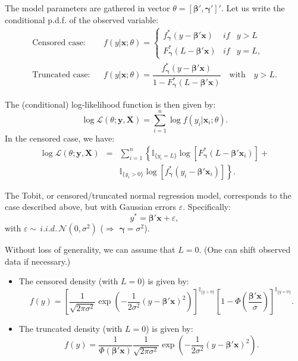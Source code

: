 \documentclass[
  12pt,
]{book}
\theoremstyle{definition}
\theoremstyle{definition}
\theoremstyle{definition}
\theoremstyle{definition}
\theoremstyle{remark}
\begin{document}
The model parameters are gathered in vector \(\theta = [\boldsymbol\beta',\boldsymbol\gamma']'\). Let us write the conditional p.d.f. of the observed variable:
\begin{eqnarray*}
\mbox{Censored case:}&& f(y|\mathbf{x};\theta) = \left\{
\begin{array}{ccc}
f_{\boldsymbol\gamma}^*(y -  \boldsymbol\beta'\mathbf{x}) &if& y>L \\
F_{\boldsymbol\gamma}^*(L-  \boldsymbol\beta'\mathbf{x}) &if& y = L,
\end{array}
\right.\\
\mbox{Truncated case:}&&  f(y|\mathbf{x};\theta) =
\dfrac{f_{\boldsymbol\gamma}^*(y -  \boldsymbol\beta'\mathbf{x})}{1 - F_{\boldsymbol\gamma}^*(L-  \boldsymbol\beta'\mathbf{x})} \quad \mbox{with} \quad y>L.
\end{eqnarray*}

The (conditional) log-likelihood function is then given by:
\[
\log \mathcal{L}(\theta;\mathbf{y},\mathbf{X}) = \sum_{i=1}^n \log f(y_i|\mathbf{x}_i;\theta).
\]
In the censored case, we have:
\begin{eqnarray*}
\log \mathcal{L}(\theta;\mathbf{y},\mathbf{X}) &=& \sum_{i=1}^n \left\{
\mathbb{I}_{\{y_i=L\}}\log\left[F_{\boldsymbol\gamma}^*(L-  \boldsymbol\beta'\mathbf{x}_i)\right] + \right.\\
&& \left. \mathbb{I}_{\{y_i>0\}} \log \left[f_{\boldsymbol\gamma}^*(y_i -  \boldsymbol\beta'\mathbf{x}_i)\right]\right\}.
\end{eqnarray*}

The Tobit, or censored/truncated normal regression model, corresponds to the case described above, but with Gaussian errors \(\varepsilon\). Specifically:
\[
y^* = \boldsymbol\beta'\mathbf{x} + \varepsilon,
\]
with \(\varepsilon \sim \,i.i.d.\,\mathcal{N}(0,\sigma^2)\) (\(\Rightarrow\) \(\boldsymbol\gamma = \sigma^2\)).

Without loss of generality, we can assume that \(L=0\). (One can shift observed data if necessary.)

\begin{itemize}
\item
  The censored density (with \(L=0\)) is given by:
  \[
  f(y) = \left[
  \frac{1}{\sqrt{2 \pi \sigma^2}}\exp\left(-\frac{1}{2 \sigma^2}(y - \boldsymbol\beta'\mathbf{x})^2\right)
  \right]^{\mathbb{I}_{\{y>0\}}}
  \left[
  1 - \Phi\left(\frac{\boldsymbol\beta'\mathbf{x}}{\sigma}\right)
  \right]^{\mathbb{I}_{\{y=0\}}}.
  \]
\item
  The truncated density (with \(L=0\)) is given by:
  \[
  f(y) = \frac{1}{\Phi(\boldsymbol\beta'\mathbf{x})}
  \frac{1}{\sqrt{2 \pi \sigma^2}}\exp\left(-\frac{1}{2 \sigma^2}(y - \boldsymbol\beta'\mathbf{x})^2\right).
  \]
\end{itemize}
\end{document}
